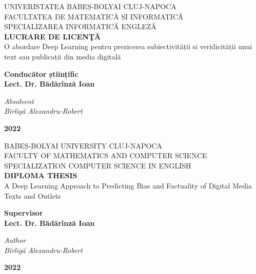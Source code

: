\begin{titlepage}
  \begin{center}
    \normalsize{
      {UNIVERISTATEA BABEȘ-BOLYAI CLUJ-NAPOCA}\\
      {FACULTATEA DE MATEMATICĂ ȘI INFORMATICĂ}\\
      {SPECIALIZAREA INFORMATICĂ ENGLEZĂ}
    }\\
    [2.5cm]
    \Large{\textbf{LUCRARE DE LICENŢĂ}}\\
    [0.75cm]
    \Huge{O abordare Deep Learning pentru prezicerea subiectivității si veridicității unui text sau publicații din media digitală }\\
    [2.5cm]
  \end{center}

  \begin{flushleft}
    \large{
      {\textbf{Conducător științific}}\\
      {\textbf{Lect. Dr. Bădărînză Ioan}}
    }\\
    [1cm]
  \end{flushleft}

  \begin{flushright}
    \large{
      {\textit{Absolvent}}\\
      {\textit{Bîrligă Alexandru-Robert}}
    }\\
    [2cm]
  \end{flushright}

  \begin{center}
    \large{\textbf{2022}}
  \end{center}
\end{titlepage}

\begin{titlepage}
  \begin{center}
    \normalsize{
      {BABEȘ-BOLYAI UNIVERSITY CLUJ-NAPOCA}\\
      {FACULTY OF MATHEMATICS AND COMPUTER SCIENCE}\\
      {SPECIALIZATION COMPUTER SCIENCE IN ENGLISH}
    }\\
    [2.5cm]
    \Large{\textbf{DIPLOMA THESIS}}\\
    [0.75cm]
    \Huge{A Deep Learning Approach to Predicting Bias and Factuality of Digital Media Texts and Outlets}\\
    [2.5cm]
  \end{center}

  \begin{flushleft}
    \large{
      {\textbf{Supervisor}}\\
      {\textbf{Lect. Dr. Bădărînză Ioan}}
    }\\
    [1cm]
  \end{flushleft}

  \begin{flushright}
    \large{
      {\textit{Author}}\\
      {\textit{Bîrligă Alexandru-Robert}}
    }\\
    [3cm]
  \end{flushright}

  \begin{center}
    \large{\textbf{2022}}
  \end{center}
\end{titlepage}